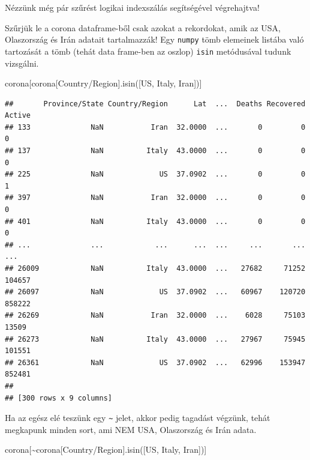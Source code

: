 \documentclass[
]{book}
\newenvironment{Shaded}{\begin{snugshade}}{\end{snugshade}}
\newcommand{\NormalTok}[1]{#1}
\newcommand{\OperatorTok}[1]{\textcolor[rgb]{0.81,0.36,0.00}{\textbf{#1}}}
\newcommand{\StringTok}[1]{\textcolor[rgb]{0.31,0.60,0.02}{#1}}
\begin{document}
Nézzünk még pár szűrést logikai indexszálás segítségével végrehajtva!

Szűrjük le a corona dataframe-ből csak azokat a rekordokat, amik az USA, Olaszország és Irán adatait tartalmazzák!
Egy \texttt{numpy} tömb elemeinek listába való tartozását a tömb (tehát data frame-ben az oszlop) \texttt{isin} metódusával tudunk vizsgálni.

\begin{Shaded}
\begin{Highlighting}[]
\NormalTok{corona[corona[}\StringTok{\textquotesingle{}Country/Region\textquotesingle{}}\NormalTok{].isin([}\StringTok{\textquotesingle{}US\textquotesingle{}}\NormalTok{, }\StringTok{\textquotesingle{}Italy\textquotesingle{}}\NormalTok{, }\StringTok{\textquotesingle{}Iran\textquotesingle{}}\NormalTok{])]}
\end{Highlighting}
\end{Shaded}

\begin{verbatim}
##       Province/State Country/Region      Lat  ...  Deaths Recovered  Active
## 133              NaN           Iran  32.0000  ...       0         0       0
## 137              NaN          Italy  43.0000  ...       0         0       0
## 225              NaN             US  37.0902  ...       0         0       1
## 397              NaN           Iran  32.0000  ...       0         0       0
## 401              NaN          Italy  43.0000  ...       0         0       0
## ...              ...            ...      ...  ...     ...       ...     ...
## 26009            NaN          Italy  43.0000  ...   27682     71252  104657
## 26097            NaN             US  37.0902  ...   60967    120720  858222
## 26269            NaN           Iran  32.0000  ...    6028     75103   13509
## 26273            NaN          Italy  43.0000  ...   27967     75945  101551
## 26361            NaN             US  37.0902  ...   62996    153947  852481
## 
## [300 rows x 9 columns]
\end{verbatim}

Ha az egész elé teszünk egy \texttt{\textasciitilde{}} jelet, akkor pedig tagadást végzünk, tehát megkapunk minden sort, ami NEM USA, Olaszország és Irán adata.

\begin{Shaded}
\begin{Highlighting}[]
\NormalTok{corona[}\OperatorTok{\textasciitilde{}}\NormalTok{corona[}\StringTok{\textquotesingle{}Country/Region\textquotesingle{}}\NormalTok{].isin([}\StringTok{\textquotesingle{}US\textquotesingle{}}\NormalTok{, }\StringTok{\textquotesingle{}Italy\textquotesingle{}}\NormalTok{, }\StringTok{\textquotesingle{}Iran\textquotesingle{}}\NormalTok{])]}
\end{Highlighting}
\end{Shaded}
\end{document}
